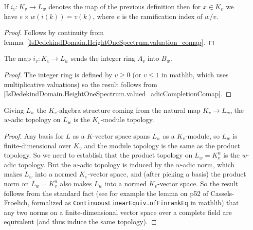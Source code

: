 \begin{lemma}
  \label{IsDedekindDomain.HeightOneSpectrum.valued_adicCompletionComap}
  \leanok
  If $i_v:K_v\to L_w$ denotes the map of the previous definition
  then for $x\in K_v$ we have
  $e\times w(i(k))=v(k)$, where $e$ is the ramification index of $w/v$.
\end{lemma}
\begin{proof}
  \leanok
  Follows by continuity from lemma~\ref{IsDedekindDomain.HeightOneSpectrum.valuation_comap}.
\end{proof}

\begin{lemma}
  \label{IsDedekindDomain.HeightOneSpectrum.adicCompletionComapSemialgHom.mapadicCompletionIntegers}
  \leanok
  The map $i_v:K_v\to L_w$ sends the integer ring $A_v$ into $B_w$.
\end{lemma}
\begin{proof}
  \leanok
  The integer ring is defined by $v\geq0$ (or $v\leq 1$ in mathlib, which uses multiplicative
  valuations) so the result follows from \ref{IsDedekindDomain.HeightOneSpectrum.valued_adicCompletionComap}.
\end{proof}
\begin{theorem}
  \label{IsDedekindDomain.HeightOneSpectrum.adicCompletionComap_isModuleTopology}
  \leanok
  Giving $L_w$ the $K_v$-algebra structure coming from the natural map $K_v\to L_w$,
  the $w$-adic topology on $L_w$ is the $K_v$-module topology.
\end{theorem}
\begin{proof}
  Any basis for $L$ as a $K$-vector space spans $L_w$ as a $K_v$-module, so $L_w$ is
  finite-dimensional over $K_v$ and the module topology is the same as the product
  topology. So we need to establish that the product topology on $L_w=K_v^n$ is
  the $w$-adic topology. But the $w$-adic topology is induced by the $w$-adic norm,
  which makes $L_w$ into a normed $K_v$-vector space, and (after picking a basis)
  the product norm on $L_w=K_v^n$ also makes $L_w$ into a normed $K_v$-vector space.
  So the result follows from the standard fact (see for example the lemma on p52
  of Cassels-Froelich, formalized as {\tt ContinuousLinearEquiv.ofFinrankEq} in mathlib)
  that any two norms on a finite-dimensional vector space over
  a complete field are equivalent (and thus induce the same topology).
\end{proof}

